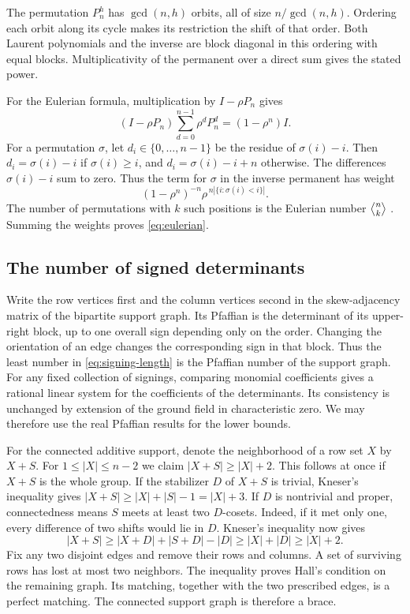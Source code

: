 \documentclass[11pt,reqno]{amsart}
\theoremstyle{remark}
\numberwithin{equation}{section}
\newcommand{\eul}[2]{\genfrac{\langle}{\rangle}{0pt}{}{#1}{#2}}
\begin{document}
The permutation \(P_n^h\) has \(\gcd(n,h)\) orbits, all of size
\(n/\gcd(n,h)\). Ordering each orbit along its cycle makes its
restriction the shift of that order. Both Laurent polynomials and the
inverse are block diagonal in this ordering with equal blocks.
Multiplicativity of the permanent over a direct sum gives the stated
power.

For the Eulerian formula, multiplication by \(I-\rho P_n\) gives
\[
 (I-\rho P_n)\sum_{d=0}^{n-1}\rho^dP_n^d
      =(1-\rho^n)I.
\]
For a permutation \(\sigma\), let \(d_i\in \{0,\ldots,n-1\}\) be the
residue of \(\sigma(i)-i\). Then \(d_i=\sigma(i)-i\) if \(\sigma(i)\ge
i\), and \(d_i=\sigma(i)-i+n\) otherwise. The differences \(\sigma(i)-i\)
sum to zero. Thus the term for \(\sigma\) in the inverse permanent has
weight
\[
 (1-\rho^n)^{-n}\rho^{\,n|\{i:\sigma(i)<i\}|}.
\]
The number of permutations with \(k\) such positions is the Eulerian
number \(\eul{n}{k}\) \cite{Stanley}. Summing the weights proves
\eqref{eq:eulerian}.

\subsection{The number of signed determinants}

Write the row vertices first and the column vertices second in the
skew-adjacency matrix of the bipartite support graph. Its Pfaffian is the
determinant of its upper-right block, up to one overall sign depending
only on the order. Changing the orientation of an edge changes the
corresponding sign in that block. Thus the least number in
\eqref{eq:signing-length} is the Pfaffian number of the support graph.
For any fixed collection of signings, comparing monomial coefficients
gives a rational linear system for the coefficients of the determinants.
Its consistency is unchanged by extension of the ground field in
characteristic zero. We may therefore use the real Pfaffian results for
the lower bounds.

For the connected additive support, denote the neighborhood of a row set
\(X\) by \(X+S\). For \(1\le |X|\le n-2\) we claim \(|X+S|\ge |X|+2\).
This follows at once if \(X+S\) is the whole group. If the stabilizer
\(D\) of \(X+S\) is trivial, Kneser's inequality gives \(|X+S|\ge
|X|+|S|-1=|X|+3\). If \(D\) is nontrivial and proper, connectedness means
\(S\) meets at least two \(D\)-cosets. Indeed, if it met only one, every
difference of two shifts would lie in \(D\). Kneser's inequality now
gives
\[
 |X+S|\ge |X+D|+|S+D|-|D|
         \ge |X|+|D|\ge |X|+2.
\]
Fix any two disjoint edges and remove their rows and columns. A set of
surviving rows has lost at most two neighbors. The inequality proves
Hall's condition on the remaining graph. Its matching, together with the
two prescribed edges, is a perfect matching. The connected support graph
is therefore a brace.
\end{document}

